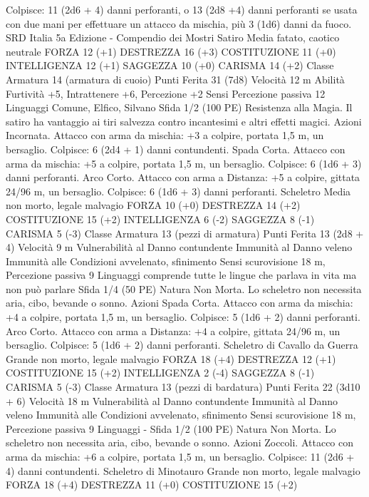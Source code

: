 \begin{multicols}{2}
Colpisce: 11 (2d6 + 4) danni perforanti, o 13 (2d8 +4) danni
perforanti se usata con due mani per effettuare un attacco da
mischia, più 3 (1d6) danni da fuoco.
SRD Italia 5a Edizione - Compendio dei Mostri
Satiro
Media fatato, caotico neutrale
FORZA 12 (+1)
DESTREZZA 16 (+3)
COSTITUZIONE 11 (+0)
INTELLIGENZA 12 (+1)
SAGGEZZA 10 (+0)
CARISMA 14 (+2)
Classe Armatura 14 (armatura di cuoio)
Punti Ferita 31 (7d8)
Velocità 12 m
Abilità Furtività +5, Intrattenere +6, Percezione +2
Sensi Percezione passiva 12
Linguaggi Comune, Elfico, Silvano
Sfida 1/2 (100 PE)
Resistenza alla Magia. Il satiro ha vantaggio ai tiri salvezza
contro incantesimi e altri effetti magici.
Azioni
Incornata. Attacco con arma da mischia: +3 a colpire, portata
1,5 m, un bersaglio.
Colpisce: 6 (2d4 + 1) danni contundenti.
Spada Corta. Attacco con arma da mischia: +5 a colpire, portata
1,5 m, un bersaglio.
Colpisce: 6 (1d6 + 3) danni perforanti.
Arco Corto. Attacco con arma a Distanza: +5 a colpire, gittata
24/96 m, un bersaglio.
Colpisce: 6 (1d6 + 3) danni perforanti.
Scheletro
Media non morto, legale malvagio
FORZA 10 (+0)
DESTREZZA 14 (+2)
COSTITUZIONE 15 (+2)
INTELLIGENZA 6 (-2)
SAGGEZZA 8 (-1)
CARISMA 5 (-3)
Classe Armatura 13 (pezzi di armatura)
Punti Ferita 13 (2d8 + 4)
Velocità 9 m
Vulnerabilità al Danno contundente
Immunità al Danno veleno
Immunità alle Condizioni avvelenato, sfinimento
Sensi scurovisione 18 m, Percezione passiva 9
Linguaggi comprende tutte le lingue che parlava in vita ma non
può parlare
Sfida 1/4 (50 PE)
Natura Non Morta. Lo scheletro non necessita aria, cibo,
bevande o sonno.
Azioni
Spada Corta. Attacco con arma da mischia: +4 a colpire, portata
1,5 m, un bersaglio.
Colpisce: 5 (1d6 + 2) danni perforanti.
Arco Corto. Attacco con arma a Distanza: +4 a colpire, gittata
24/96 m, un bersaglio.
Colpisce: 5 (1d6 + 2) danni perforanti.
Scheletro di Cavallo da Guerra
Grande non morto, legale malvagio
FORZA 18 (+4)
DESTREZZA 12 (+1)
COSTITUZIONE 15 (+2)
INTELLIGENZA 2 (-4)
SAGGEZZA 8 (-1)
CARISMA 5 (-3)
Classe Armatura 13 (pezzi di bardatura)
Punti Ferita 22 (3d10 + 6)
Velocità 18 m
Vulnerabilità al Danno contundente
Immunità al Danno veleno
Immunità alle Condizioni avvelenato, sfinimento
Sensi scurovisione 18 m, Percezione passiva 9
Linguaggi -
Sfida 1/2 (100 PE)
Natura Non Morta. Lo scheletro non necessita aria, cibo,
bevande o sonno.
Azioni
Zoccoli. Attacco con arma da mischia: +6 a colpire, portata 1,5
m, un bersaglio.
Colpisce: 11 (2d6 + 4) danni contundenti.
Scheletro di Minotauro
Grande non morto, legale malvagio
FORZA 18 (+4)
DESTREZZA 11 (+0)
COSTITUZIONE 15 (+2)

\end{multicols}
